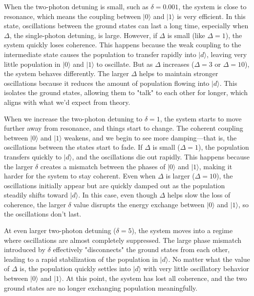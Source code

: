 \documentclass{article}
\begin{document}
When the two-photon detuning is small, such as \(\delta = 0.001\), the system is close to resonance, which means the coupling between \(|0\rangle\) and \(|1\rangle\) is very efficient. In this state, oscillations between the ground states can last a long time, especially when \(\Delta\), the single-photon detuning, is large. However, if \(\Delta\) is small (like \(\Delta = 1\)), the system quickly loses coherence. This happens because the weak coupling to the intermediate state causes the population to transfer rapidly into \(|d\rangle\), leaving very little population in \(|0\rangle\) and \(|1\rangle\) to oscillate. But as \(\Delta\) increases (\(\Delta = 3\) or \(\Delta = 10\)), the system behaves differently. The larger \(\Delta\) helps to maintain stronger oscillations because it reduces the amount of population flowing into \(|d\rangle\). This isolates the ground states, allowing them to "talk" to each other for longer, which aligns with what we’d expect from theory.

When we increase the two-photon detuning to \(\delta = 1\), the system starts to move further away from resonance, and things start to change. The coherent coupling between \(|0\rangle\) and \(|1\rangle\) weakens, and we begin to see more damping—that is, the oscillations between the states start to fade. If \(\Delta\) is small (\(\Delta = 1\)), the population transfers quickly to \(|d\rangle\), and the oscillations die out rapidly. This happens because the larger \(\delta\) creates a mismatch between the phases of \(|0\rangle\) and \(|1\rangle\), making it harder for the system to stay coherent. Even when \(\Delta\) is larger (\(\Delta = 10\)), the oscillations initially appear but are quickly damped out as the population steadily shifts toward \(|d\rangle\). In this case, even though \(\Delta\) helps slow the loss of coherence, the larger \(\delta\) value disrupts the energy exchange between \(|0\rangle\) and \(|1\rangle\), so the oscillations don’t last.

At even larger two-photon detuning (\(\delta = 5\)), the system moves into a regime where oscillations are almost completely suppressed. The large phase mismatch introduced by \(\delta\) effectively "disconnects" the ground states from each other, leading to a rapid stabilization of the population in \(|d\rangle\). No matter what the value of \(\Delta\) is, the population quickly settles into \(|d\rangle\) with very little oscillatory behavior between \(|0\rangle\) and \(|1\rangle\). At this point, the system has lost all coherence, and the two ground states are no longer exchanging population meaningfully.
\end{document}
